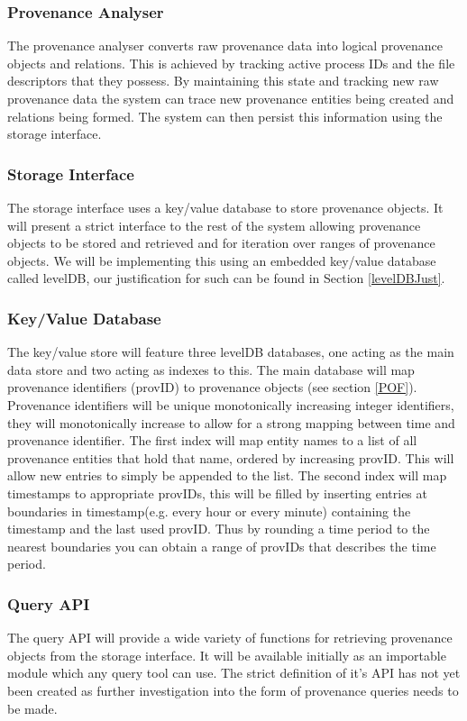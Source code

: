 \subsubsection{Provenance Analyser}
The provenance analyser converts raw provenance data into logical provenance objects and relations. This is achieved by tracking active process IDs and the file descriptors that they possess. By maintaining this state and tracking new raw provenance data the system can trace new provenance entities being created and relations being formed. The system can then persist this information using the storage interface.

\subsubsection{Storage Interface}
The storage interface uses a key/value database to store provenance objects. It will present a strict interface to the rest of the system allowing provenance objects to be stored and retrieved and for iteration over ranges of provenance objects. We will be implementing this using an embedded key/value database called levelDB, our justification for such can be found in Section \ref{levelDBJust}. 

\subsubsection{Key/Value Database}
The key/value store will feature three levelDB databases, one acting as the main data store and two acting as indexes to this. The main database will map provenance identifiers (provID) to provenance objects (see section \ref{POF}). Provenance identifiers will be unique monotonically increasing integer identifiers, they will monotonically increase to allow for a strong mapping between time and provenance identifier. The first index will map entity names to a list of all provenance entities that hold that name, ordered by increasing provID. This will allow new entries to simply be appended to the list. The second index will map timestamps to appropriate provIDs, this will be filled by inserting entries at boundaries in timestamp(e.g. every hour or every minute) containing the timestamp and the last used provID. Thus by rounding a time period to the nearest boundaries you can obtain a range of provIDs that describes the time period.

\subsubsection{Query API}
The query API will provide a wide variety of functions for retrieving provenance objects from the storage interface. It will be available initially as an importable module which any query tool can use. The strict definition of it's API has not yet been created as further investigation into the form of provenance queries needs to be made.

